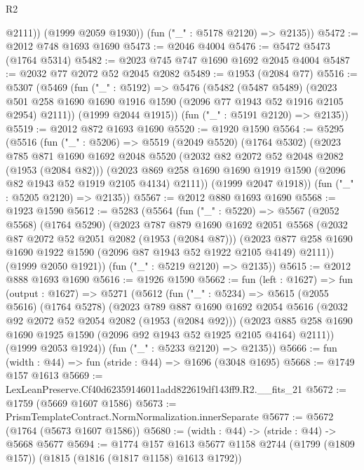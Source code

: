 \begin{lexlean}{R2}
\begin{coremodule}
            @2111))
        (@1999 @2059 @1930))
      (fun ("_" : @5178 @2120) => @2135))
@5472 := @2012 @748 @1693 @1690
@5473 := @2046 @4004
@5476 := @5472 @5473 (@1764 @5314)
@5482 := @2023 @745 @747 @1690 @1692 @2045 @4004
@5487 := @2032 @77 @2072 @52 @2045 @2082
@5489 := @1953 (@2084 @77)
@5516 := @5307
    (@5469
      (fun ("_" : @5192) =>
      @5476
        (@5482
          (@5487 @5489)
          (@2023 @501 @258 @1690 @1690 @1916 @1590 (@2096 @77 @1943 @52 @1916 @2105 @2954) @2111))
        (@1999 @2044 @1915))
      (fun ("_" : @5191 @2120) => @2135))
@5519 := @2012 @872 @1693 @1690
@5520 := @1920 @1590
@5564 := @5295
    (@5516
      (fun ("_" : @5206) =>
      @5519
        (@2049 @5520)
        (@1764 @5302)
        (@2023
          @785
          @871
          @1690
          @1692
          @2048
          @5520
          (@2032 @82 @2072 @52 @2048 @2082 (@1953 (@2084 @82)))
          (@2023 @869 @258 @1690 @1690 @1919 @1590 (@2096 @82 @1943 @52 @1919 @2105 @4134) @2111))
        (@1999 @2047 @1918))
      (fun ("_" : @5205 @2120) => @2135))
@5567 := @2012 @880 @1693 @1690
@5568 := @1923 @1590
@5612 := @5283
    (@5564
      (fun ("_" : @5220) =>
      @5567
        (@2052 @5568)
        (@1764 @5290)
        (@2023
          @787
          @879
          @1690
          @1692
          @2051
          @5568
          (@2032 @87 @2072 @52 @2051 @2082 (@1953 (@2084 @87)))
          (@2023 @877 @258 @1690 @1690 @1922 @1590 (@2096 @87 @1943 @52 @1922 @2105 @4149) @2111))
        (@1999 @2050 @1921))
      (fun ("_" : @5219 @2120) => @2135))
@5615 := @2012 @888 @1693 @1690
@5616 := @1926 @1590
@5662 := fun (left : @1627) =>
  fun (output : @1627) =>
  @5271
    (@5612
      (fun ("_" : @5234) =>
      @5615
        (@2055 @5616)
        (@1764 @5278)
        (@2023
          @789
          @887
          @1690
          @1692
          @2054
          @5616
          (@2032 @92 @2072 @52 @2054 @2082 (@1953 (@2084 @92)))
          (@2023 @885 @258 @1690 @1690 @1925 @1590 (@2096 @92 @1943 @52 @1925 @2105 @4164) @2111))
        (@1999 @2053 @1924))
      (fun ("_" : @5233 @2120) => @2135))
@5666 := fun (width : @44) => fun (stride : @44) => @1696 (@3048 @1695)
@5668 := @1749 @157 @1613
@5669 := LexLeanPreserve.Cf40d62359146011add822619df143ff9.R2.__fits_21
@5672 := @1759 (@5669 @1607 @1586)
@5673 := PrismTemplateContract.NormNormalization.innerSeparate
@5677 := @5672 (@1764 (@5673 @1607 @1586))
@5680 := (width : @44) -> (stride : @44) -> @5668 @5677
@5694 := @1774
    @157
    @1613
    @5677
    @1158
    @2744
    (@1799 (@1809 @157))
    (@1815 (@1816 (@1817 @1158) @1613 @1792))

\end{coremodule}
\end{lexlean}
